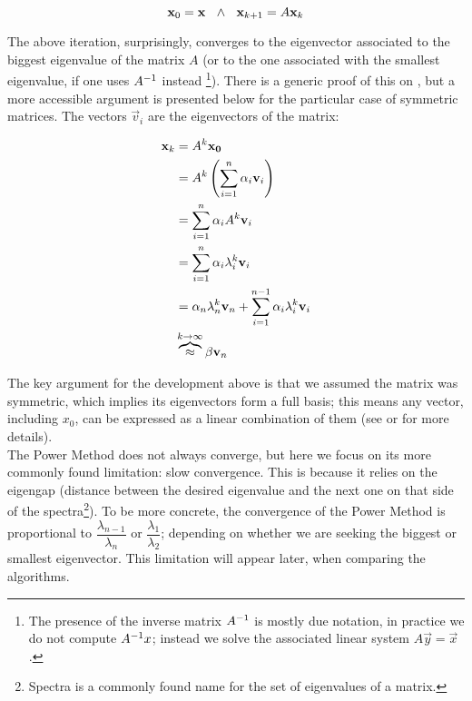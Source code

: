 \begin{equation*}
    \vec{x}_0 = \vec{x} \ds{\ds{\land}}
    \vec{x}_{k+1} = A\vec{x}_k  
\end{equation*}
\joinbelow{1cm}

The above iteration, surprisingly, converges to the eigenvector
associated to the biggest eigenvalue of the matrix $A$ (or to the one
associated with the smallest eigenvalue, if one uses $\inv{A}$ instead
\footnote{The presence of the inverse matrix $\inv{A}$ is mostly due
  notation, in practice we do not compute $\inv{A}x$; instead we solve the
  associated linear system $A\vec{y} = \vec{x}$.}). There is a
generic proof of this on \cite{saad92}, but a more accessible argument
is presented below for the particular case of symmetric matrices. The vectors
$\vec{v}_i$ are the eigenvectors of the matrix:

\begin{align*}
  \vec{x}_k &= A^{k}\vec{x_0} \\
  &= A^{k}\left(\sum\limits_{\tiny{i=1}}^{n} \alpha_i\vec{v}_i \right) \\
  &= \sum\limits_{\tiny{i=1}}^{n} \alpha_i A^{k} \vec{v}_i  \\
  &= \sum\limits_{\tiny{i=1}}^{n} \alpha_i \lambda_i^{k} \vec{v}_i \\
  &= \alpha_n \lambda_n^{k} \vec{v}_n +
  \sum\limits_{\tiny{i=1}}^{n-1} \alpha_i \lambda_i^{k} \vec{v}_i \\
  & \overbrace{\approx}^{k \to \infty} \beta \vec{v}_n  
\end{align*}

The key argument for the development above is that we assumed the
matrix was symmetric, which implies its eigenvectors form a full
basis; this means any vector, including $x_0$, can be expressed as a
linear combination of them (see \cite{strang88} or \cite{golub13} for
more details). \\

The Power Method does not always converge, but here we focus on its
more commonly found limitation: slow convergence. This is because it
relies on the eigengap (distance between the desired eigenvalue and
the next one on that side of the spectra\footnote{Spectra is a
  commonly found name for the set of eigenvalues of a matrix.}). To be
more concrete, the convergence of the Power Method is proportional to
$\dfrac{\lambda_{n-1}}{\lambda_n}$ or $\dfrac{\lambda_1}{\lambda_2}$;
depending on whether we are seeking the  biggest or smallest
eigenvector. This limitation will appear
later, when comparing the algorithms.

